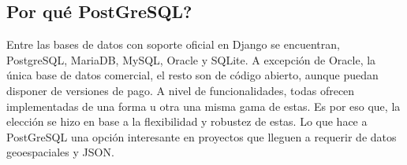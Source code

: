 \subsection{Por qué PostGreSQL?}
Entre las bases de datos con soporte oficial en Django se encuentran, PostgreSQL, MariaDB, MySQL, Oracle y SQLite. A excepción de Oracle, la única base de datos comercial, el resto son de código abierto, aunque puedan disponer de versiones de pago.\newline
\newline
A nivel de funcionalidades, todas ofrecen implementadas de una forma u otra una misma gama de estas. Es por eso que, la elección se hizo en base a la flexibilidad y robustez de estas. Lo que hace a PostGreSQL una opción interesante en proyectos que lleguen a requerir de datos geoespaciales y JSON.
